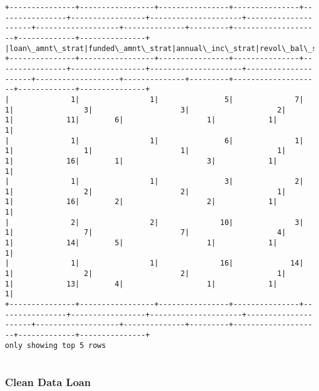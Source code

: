 \documentclass[11pt]{article}
\begin{document}
    \begin{Verbatim}[commandchars=\\\{\}]
+---------------+-----------------+----------------+---------------+----------------+-----------------+---------------------+---------------------+-------------------+--------------+---------+--------------------+-------------+---------------+
|loan\_amnt\_strat|funded\_amnt\_strat|annual\_inc\_strat|revol\_bal\_strat|revol\_util\_strat|total\_pymnt\_strat|total\_pymnt\_inv\_strat|total\_rec\_prncp\_strat|total\_rec\_int\_strat|int\_rate\_strat|dti\_strat|inq\_last\_6mths\_strat|pub\_rec\_strat|total\_acc\_strat|
+---------------+-----------------+----------------+---------------+----------------+-----------------+---------------------+---------------------+-------------------+--------------+---------+--------------------+-------------+---------------+
|              1|                1|               5|              7|               1|                3|                    3|                    2|                  1|            11|        6|                   1|            1|              1|
|              1|                1|               6|              1|               1|                1|                    1|                    1|                  1|            16|        1|                   3|            1|              1|
|              1|                1|               3|              2|               1|                2|                    2|                    1|                  1|            16|        2|                   2|            1|              1|
|              2|                2|              10|              3|               1|                7|                    7|                    4|                  1|            14|        5|                   1|            1|              1|
|              1|                1|              16|             14|               1|                2|                    2|                    1|                  1|            13|        4|                   1|            1|              1|
+---------------+-----------------+----------------+---------------+----------------+-----------------+---------------------+---------------------+-------------------+--------------+---------+--------------------+-------------+---------------+
only showing top 5 rows


    \end{Verbatim}

    \hypertarget{clean-data-loan}{%
\subsubsection{Clean Data Loan}\label{clean-data-loan}}
\end{document}
